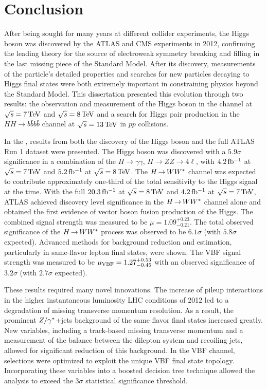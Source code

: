 \chapter{Conclusion}
\label{conclusion}

After being sought for many years at different collider experiments, the Higgs boson was discovered by the ATLAS and CMS experiments in 2012, confirming the leading theory for the source of electroweak symmetry breaking and filling in the last missing piece of the Standard Model. After its discovery, measurements of the particle's detailed properties and searches for new particles decaying to Higgs final states were both extremely important in constraining physics beyond the Standard Model. This dissertation presented this evolution through two results: the observation and measurement of the Higgs boson in the \HWWfull channel at $\sqrt{s} = 7 \TeV$ and $\sqrt{s} = 8 \TeV$ and a search for Higgs pair production in the $HH\to b\bar{b}b\bar{b}$ channel at $\sqrt{s} = 13 \TeV$ in $pp$ collisions.

In the \HWWfull, results from both the discovery of the Higgs boson and the full ATLAS Run 1 dataset were presented. The Higgs boson was discovered with a $5.9\sigma$ significance in a combination of the $H\to\gamma\gamma$, $H\to ZZ \to 4\ell$, \HWWfull with $4.2\mbox{\,fb$^{-1}$}$ at $\sqrt{s} = 7 \TeV$ and $5.2\mbox{\,fb$^{-1}$}$ at $\sqrt{s} = 8 \TeV$. The $H{\,{\rightarrow}\,}WW^\ast$ channel was expected to contribute approximately one-third of the total sensitivity to the Higgs signal at the time. With the full $20.3\mbox{\,fb$^{-1}$}$ at $\sqrt{s} =  8 \TeV$ and $4.2\mbox{\,fb$^{-1}$}$ at $\sqrt{s} = 7 \TeV$, ATLAS achieved discovery level significance in the $H{\,{\rightarrow}\,}WW^\ast$ channel alone and obtained the first evidence of vector boson fusion production of the Higgs. The combined signal strength was measured to be $\mu = 1.09^{+0.23}_{-0.21}$. The total observed significance of the $H{\,{\rightarrow}\,}WW^\ast$ process was observed to be $6.1\sigma$ (with $5.8 \sigma$ expected). Advanced methods for background reduction and estimation, particularly in same-flavor lepton final states, were shown. The VBF signal strength was measured to be $\mu_{\rm VBF} = 1.27^{+0.53}_{-0.45}$ with an observed significance of $3.2\sigma$ (with $2.7 \sigma$ expected). 

These results required many novel innovations. The increase of pileup interactions in the higher instantaneous luminosity LHC conditions of 2012 led to a degradation of missing transverse momentum resolution. As a result, the prominent $Z/\gamma^{\ast}$+jets background of the same flavor \HWWfull final states increased greatly. New variables, including a track-based missing transverse momentum and a measurement of the balance between the dilepton system and recoiling jets, allowed for significant reduction of this background. In the VBF channel, selections were optimized to exploit the unique VBF final state topology. Incorporating these variables into a boosted decision tree technique allowed the analysis to exceed the $3\sigma$ statistical significance threshold.

